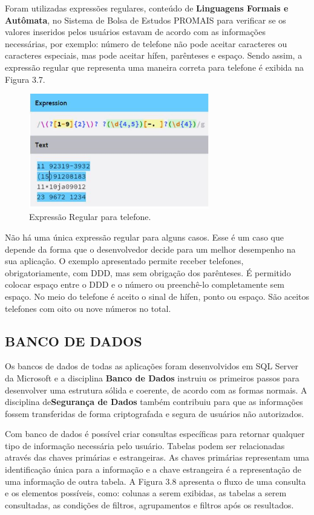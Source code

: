 \documentclass[
  12pt,				%
  openany,
  oneside,
  a4paper,			%
  english,			%
  brazil
]{article}
\numberwithin{figure}{section}
\numberwithin{table}{section}
\begin{document}
Foram utilizadas expressões regulares, conteúdo de \textbf{Linguagens Formais e Autômata},
no Sistema de Bolsa de Estudos PROMAIS para verificar se os valores inseridos pelos usuários estavam de acordo com as informações necessárias, por exemplo: número de telefone não pode aceitar caracteres ou caracteres especiais, mas pode aceitar hífen, parênteses e espaço. Sendo assim, a expressão regular que representa uma maneira correta para telefone é exibida na Figura 3.7.

\begin{figure}[!htb]
\centering
\includegraphics[width=0.7\textwidth]{figura37}
\caption{Expressão Regular para telefone.}
\end{figure}

Não há uma única expressão regular para alguns casos. Esse é um caso que depende da forma que o desenvolvedor decide para um melhor desempenho na sua aplicação. O exemplo apresentado permite receber telefones, obrigatoriamente, com DDD, mas sem obrigação dos parênteses. É permitido colocar espaço entre o DDD e o número ou preenchê-lo completamente sem espaço. No meio do telefone é aceito o sinal de hífen, ponto ou espaço. São aceitos telefones com oito ou nove números no total.



\subsection{BANCO DE DADOS}

Os bancos de dados de todas as aplicações foram desenvolvidos em SQL Server da Microsoft e a disciplina \textbf{Banco de Dados} instruiu os primeiros passos para desenvolver uma estrutura sólida e coerente, de acordo com as formas normais. A disciplina de\textbf{Segurança de Dados} também contribuiu para que as informações fossem transferidas de forma criptografada e segura de usuários não autorizados.

Com banco de dados é possível criar consultas específicas para retornar qualquer tipo de informação necessária pelo usuário. Tabelas podem ser relacionadas através das chaves primárias e estrangeiras. As chaves primárias representam uma identificação única para a informação e a chave estrangeira é a representação de uma informação de outra tabela. A Figura 3.8 apresenta o fluxo de uma consulta e os elementos possíveis, como: colunas a serem exibidas, as tabelas a serem consultadas, as condições de filtros, agrupamentos e filtros após os resultados.
\end{document}
